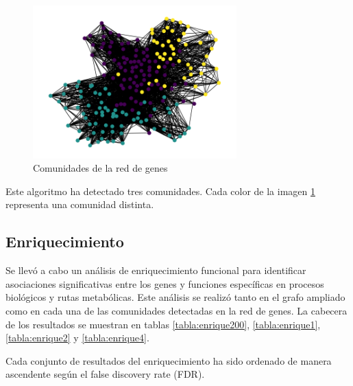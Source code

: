 \begin{figure}[h!]
	\centering
	\includegraphics[width=0.7\textwidth]{../results/graph_communities.png}
	\caption{Comunidades de la red de genes}
	\label{fig:comunidades}
\end{figure}

Este algoritmo ha detectado tres comunidades. Cada color de la imagen \ref{fig:comunidades} representa una comunidad distinta.

\subsection{Enriquecimiento}

Se llevó a cabo un análisis de enriquecimiento funcional para identificar asociaciones significativas entre los genes y funciones específicas en procesos biológicos y rutas metabólicas. Este análisis se realizó tanto en el grafo ampliado como en cada una de las comunidades detectadas en la red de genes. La cabecera de los resultados se muestran en tablas \ref{tabla:enrique200}, \ref{tabla:enrique1}, \ref{tabla:enrique2} y \ref{tabla:enrique4}.

Cada conjunto de resultados del enriquecimiento ha sido ordenado de manera ascendente según el false discovery rate (FDR).



